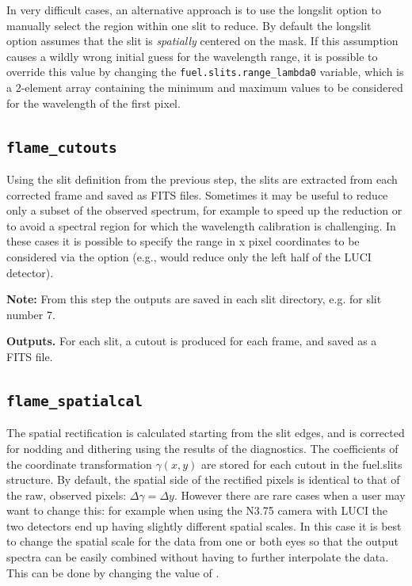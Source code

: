 \documentclass[a4paper]{article}
\begin{document}
\begin{sloppypar}
In very difficult cases, an alternative approach is to use the longslit option to manually select the region within one slit to reduce. By default the longslit option assumes that the slit is \emph{spatially} centered on the mask. If this assumption causes a wildly wrong initial guess for the wavelength range, it is possible to override this value by changing the \texttt{fuel.slits.range\_lambda0} variable, which is a 2-element array containing the minimum and maximum values to be considered for the wavelength of the first pixel.


\subsection{\texttt{flame\_cutouts}}
\label{sec:cutouts}

Using the slit definition from the previous step, the slits are extracted from each corrected frame and saved as FITS files. Sometimes it may be useful to reduce only a subset of the observed spectrum, for example to speed up the reduction or to avoid a spectral region for which the wavelength calibration is challenging. In these cases it is possible to specify the range in x pixel coordinates to be considered via the  option (e.g.,  would reduce only the left half of the LUCI detector).

\medskip
\noindent
\textbf{Note:} From this step the outputs are saved in each slit directory, e.g.  for slit number 7.

\medskip
\noindent
\textbf{Outputs.} For each slit, a cutout is produced for each frame, and saved as a FITS file.


\subsection{\texttt{flame\_spatialcal}}
\label{sec:spatialcal}

The spatial rectification is calculated starting from the slit edges, and is corrected for nodding and dithering using the results of the diagnostics. The coefficients of the coordinate transformation $\gamma(x,y)$ are stored for each cutout in the fuel.slits structure. By default, the spatial side of the rectified pixels is identical to that of the raw, observed pixels: $\Delta \gamma = \Delta y$. However there are rare cases when a user may want to change this: for example when using the N3.75 camera with LUCI the two detectors end up having slightly different spatial scales. In this case it is best to change the spatial scale for the data from one or both eyes so that the output spectra can be easily combined without having to further interpolate the data. This can be done by changing the value of .


\end{sloppypar}
\end{document}
